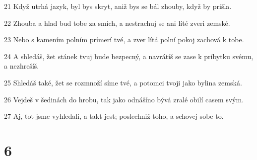 \par 21 Když utrhá jazyk, byl bys skryt, aniž bys se bál zhouby, když by prišla.
\par 22 Zhouba a hlad bud tobe za smích, a nestrachuj se ani líté zveri zemské.
\par 23 Nebo s kamením polním prímerí tvé, a zver lítá polní pokoj zachová k tobe.
\par 24 A shledáš, žet stánek tvuj bude bezpecný, a navrátíš se zase k príbytku svému, a nezhrešíš.
\par 25 Shledáš také, žet se rozmnoží síme tvé, a potomci tvoji jako bylina zemská.
\par 26 Vejdeš v šedinách do hrobu, tak jako odnášíno bývá zralé obilí casem svým.
\par 27 Aj, tot jsme vyhledali, a takt jest; poslechniž toho, a schovej sobe to.

\chapter{6}

